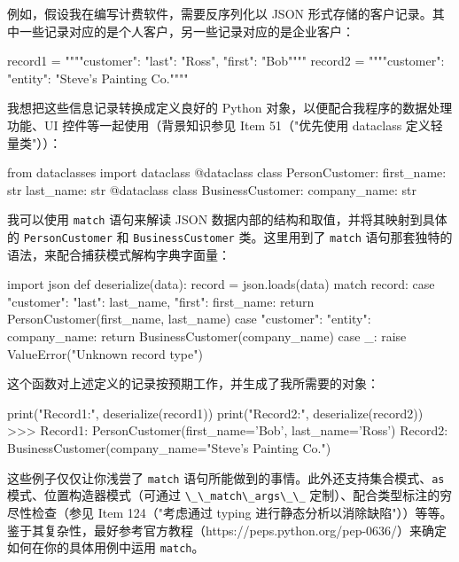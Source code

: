 例如，假设我在编写计费软件，需要反序列化以 JSON 形式存储的客户记录。其中一些记录对应的是个人客户，另一些记录对应的是企业客户：

\begin{codebox}[python]
record1 = """{"customer": {"last": "Ross", "first": "Bob"}}"""
record2 = """{"customer": {"entity": "Steve's Painting Co."}}"""
\end{codebox}

我想把这些信息记录转换成定义良好的 Python 对象，以便配合我程序的数据处理功能、UI 控件等一起使用（背景知识参见 Item 51（"优先使用 dataclass 定义轻量类"））：

\begin{codebox}[python]
from dataclasses import dataclass
@dataclass
class PersonCustomer:
    first_name: str
    last_name: str
@dataclass
class BusinessCustomer:
    company_name: str
\end{codebox}

我可以使用 \verb|match| 语句来解读 JSON 数据内部的结构和取值，并将其映射到具体的 \verb|PersonCustomer| 和 \verb|BusinessCustomer| 类。这里用到了 \verb|match| 语句那套独特的语法，来配合捕获模式解构字典字面量：

\begin{codebox}[python]
import json
def deserialize(data):
    record = json.loads(data)
    match record:
        case {"customer": { "last": last_name,
"first": first_name}}:
            return PersonCustomer(first_name, last_name)
        case {"customer": {"entity": company_name}}:
            return BusinessCustomer(company_name)
        case _:
            raise ValueError("Unknown record type")
\end{codebox}

这个函数对上述定义的记录按预期工作，并生成了我所需要的对象：

\begin{codebox}[python]
print("Record1:", deserialize(record1))
print("Record2:", deserialize(record2))
>>>
Record1: PersonCustomer(first_name='Bob', last_name='Ross')
Record2: BusinessCustomer(company_name="Steve's Painting Co.")
\end{codebox}

这些例子仅仅让你浅尝了 \verb|match| 语句所能做到的事情。此外还支持集合模式、\verb|as| 模式、位置构造器模式（可通过 \verb|\_\_match\_args\_\_| 定制）、配合类型标注的穷尽性检查（参见 Item 124（"考虑通过 typing 进行静态分析以消除缺陷"））等等。鉴于其复杂性，最好参考官方教程（https://peps.python.org/pep-0636/）来确定如何在你的具体用例中运用 \verb|match|。

